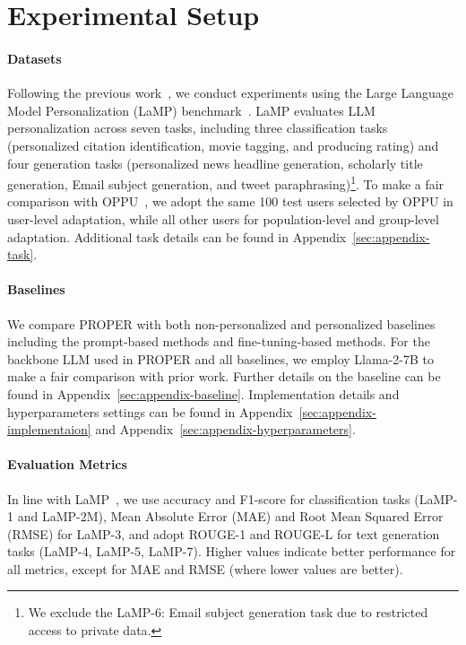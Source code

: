 \documentclass[11pt]{article}
\begin{document}
\section{Experimental Setup}

\paragraph{Datasets} 
Following the previous work~\cite{tan-etal-2024-democratizing,tan-etal-2024-personalized,zhuang2024hydra}, we conduct experiments using the Large Language Model Personalization (LaMP) benchmark~\cite{salemi-etal-2024-lamp}.
LaMP evaluates LLM personalization across seven tasks, including three classification tasks (personalized citation identification, movie tagging, and producing rating) and four generation tasks (personalized news headline generation, scholarly title generation, Email subject generation, and tweet paraphrasing)\footnote{We exclude the LaMP-6: Email subject generation task due to restricted access to private data.}.
To make a fair comparison with OPPU~\cite{tan-etal-2024-democratizing}, we adopt the same 100 test users selected by OPPU in user-level adaptation, while all other users for population-level and group-level adaptation.
Additional task details can be found in Appendix~\ref{sec:appendix-task}.


\paragraph{Baselines} 
We compare PROPER with both non-personalized and personalized baselines including the prompt-based methods and fine-tuning-based methods. 
For the backbone LLM used in PROPER and all baselines, we employ Llama-2-7B to make a fair comparison with prior work. 
Further details on the baseline can be found in Appendix~\ref{sec:appendix-baseline}.
Implementation details and hyperparameters settings can be found in Appendix~\ref{sec:appendix-implementaion} and Appendix~\ref{sec:appendix-hyperparameters}.


\paragraph{Evaluation Metrics}
In line with LaMP~\cite{salemi-etal-2024-lamp}, we use accuracy and F1-score for classification tasks (LaMP-1 and LaMP-2M), Mean Absolute Error (MAE) and Root Mean Squared Error (RMSE) for LaMP-3, and adopt ROUGE-1 and ROUGE-L for text generation tasks (LaMP-4, LaMP-5, LaMP-7). Higher values indicate better performance for all metrics, except for MAE and RMSE (where lower values are better).
\end{document}

